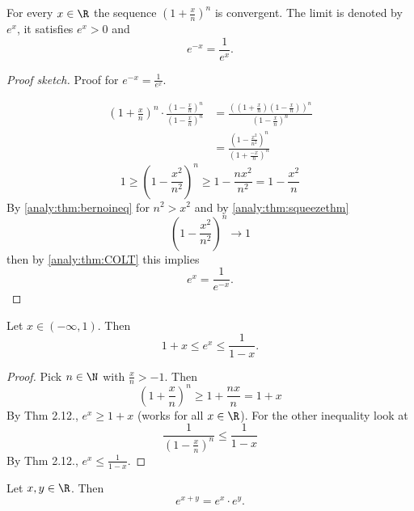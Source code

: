 \documentclass[10pt, a4paper]{article}
\begin{document}
\begin{theorem}
    For every $x \in \R$ the sequence $\left(1 + \frac{x}{n}\right) ^ n$ is convergent.
    The limit is denoted by $e ^ x$,
    it satisfies $e ^ x  > 0$ and
    \[
    e ^ {-x} = \frac{1}{e ^ x}.
    \]
    \begin{proof}[Proof sketch]\renewcommand{\qedsymbol}{$\triangle$}
        Proof for $e ^ {-x} = \frac{1}{e ^ x}$.

        \begin{align*}
            \left(1 + \frac{x}{n}\right) ^ n \cdot \frac{\left(1 - \frac{x}{n}\right) ^ n}{\left(1 - \frac{x}{n}\right) ^ n} &= \frac{\left(\left(1 + \frac{x}{n}\right)\left(1 - \frac{x}{n}\right)\right) ^ n}{\left(1 - \frac{x}{n}\right) ^ n} \\
            &= \frac{\left(1 - \frac{x ^ 2}{n ^ 2}\right) ^ n}{\left(1 + \frac{-x}{n}\right) ^ n}
        \end{align*}
        \[
        1 \geq \left(1 - \frac{x ^ 2}{n ^ 2}\right) ^ n \geq 1 - \frac{nx ^ 2}{n ^ 2} = 1 - \frac{x ^ 2}{n}
        \]
        By \autoref{analy:thm:bernoineq} for $n ^ 2 > x ^ 2$
        and by \autoref{analy:thm:squeezethm}
        \[
        \left(1 - \frac{x ^ 2}{n ^ 2}\right) ^ n \to 1
        \]
        then by \autoref{analy:thm:COLT} this implies
        \[
        e ^ x = \frac{1}{e ^ {-x}}.
        \]
    \end{proof}
\end{theorem}

\begin{lemma}\label{analy:lem:expboundlemma}
    Let $x \in (-\infty, 1)$.
    Then
    \[
    1 + x \leq e ^ x \leq \frac{1}{1 - x}.
    \]
    \begin{proof}
        Pick $n \in \N$ with $\frac{x}{n} > -1$.
        Then
        \[
        \left(1 + \frac{x}{n}\right) ^ n \geq 1 + \frac{nx}{n} = 1 + x
        \]
        By Thm 2.12.,
        $e ^ x \geq 1 + x$
        (works for all $x \in \R$).
        For the other inequality look at
        \[
        \frac{1}{\left(1 - \frac{x}{n}\right) ^ n} \leq \frac{1}{1 - x}
        \]
        By Thm 2.12.,
        $e ^ x \leq \frac{1}{1 - x}$.
    \end{proof}
\end{lemma}

\begin{theorem}
    Let $x, y \in \R$.
    Then
    \[
    e ^ {x + y} = e ^ x \cdot e ^ y.
    \]
\end{theorem}
\end{document}
